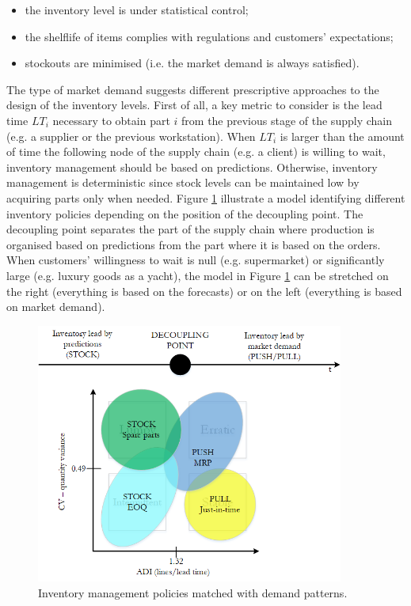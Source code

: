 \begin{itemize}
    \item the inventory level is under statistical control;
    \item the shelflife of items complies with regulations and customers’ expectations;
    \item stockouts are minimised (i.e. the market demand is always satisfied).

\end{itemize}

The type of market demand suggests different prescriptive approaches to the design of the inventory levels. First of all, a key metric to consider is the lead time $LT_i$ necessary to obtain part $i$ from the previous stage of the supply chain (e.g. a supplier or the previous workstation). When $LT_i$ is larger than the amount of time the following node of the supply chain (e.g. a client) is willing to wait, inventory management should be based on predictions. Otherwise, inventory management is deterministic since stock levels can be maintained low by acquiring parts only when needed. Figure \ref{fig_prod_inventory_mgmt} illustrate a model identifying different inventory policies depending on the position of the decoupling point. The decoupling point separates the part of the supply chain where production is organised based on predictions from the part where it is based on the orders. When customers’ willingness to wait is null (e.g. supermarket) or significantly large (e.g. luxury goods as a yacht), the model in Figure \ref{fig_prod_inventory_mgmt} can be stretched on the right (everything is based on the forecasts) or on the left (everything is based on market demand).

\begin{figure}[hbt!]
\centering
\includegraphics[width=0.9\textwidth]{sectionProduction/design_process_figures/fig_prod_inventory_mgmt.png}
\captionsetup{type=figure}
\caption{Inventory management policies matched with demand patterns.}
\label{fig_prod_inventory_mgmt}
\end{figure}

